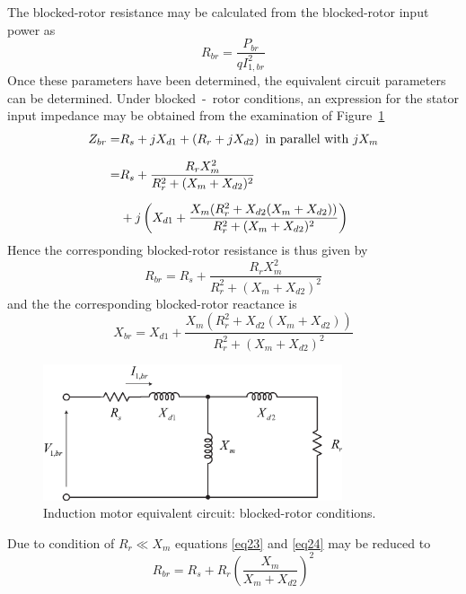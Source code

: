 \documentclass[11pt,a4paper,oneside]{book}
\numberwithin{equation}{section}
\theoremstyle{it}
\theoremstyle{definition}
\begin{document}
The blocked-rotor resistance may be calculated from the blocked-rotor input power as 
\begin{equation} \label{eq21}
	R_{br} = \frac{P_{br}}{qI_{1,br}^2}
\end{equation} 
Once these parameters have been determined, the equivalent circuit parameters can be determined. Under blocked~-~rotor conditions, an expression for the stator input impedance may be obtained from the examination of Figure~\ref{rotor_locked_test}
\begin{equation} \label{eq22}
	\begin{aligned}
		Z_{br} 	= & R_s + jX_{d1} + \left( R_r + j X_{d2} \right) \textmd{ in parallel with } jX_m \\[6pt]
		= & R_s + \frac{R_rX_m^2}{R_r^2+(X_m+X_{d2})^2} \\[6pt]
		& + j \left(X_{d1} + \frac{X_m(R_r^2+X_{d2}(X_m+X_{d2}))}{R_r^2+(X_m+X_{d2})^2}\right)
	\end{aligned}
\end{equation}
Hence the corresponding blocked-rotor resistance is thus given by
\begin{equation} \label{eq23}
	R_{br} = R_s + \frac{R_rX_m^2}{R_r^2+(X_m+X_{d2})^2} 
\end{equation} 
and the the corresponding blocked-rotor reactance is
\begin{equation} \label{eq24}
	X_{br} = X_{d1} + \frac{X_m(R_r^2+X_{d2}(X_m+X_{d2}))}{R_r^2+(X_m+X_{d2})^2}
\end{equation} 
\begin{figure}[H]
	\centering
	\includegraphics[width = 250pt, keepaspectratio]{figures/rotor_locked_test.eps}
	\captionsetup{width=0.5\textwidth, font=small}		
	\caption{Induction motor equivalent circuit: blocked-rotor conditions.}
	\label{rotor_locked_test} 
\end{figure}
Due to condition of $R_r \ll X_m$ equations \eqref{eq23} and \eqref{eq24} may be reduced to
\begin{equation} \label{eq25}
	R_{br} = R_s + R_r \left(\frac{X_m}{X_m+X_{d2}}\right)^2
\end{equation} 
\end{document}
